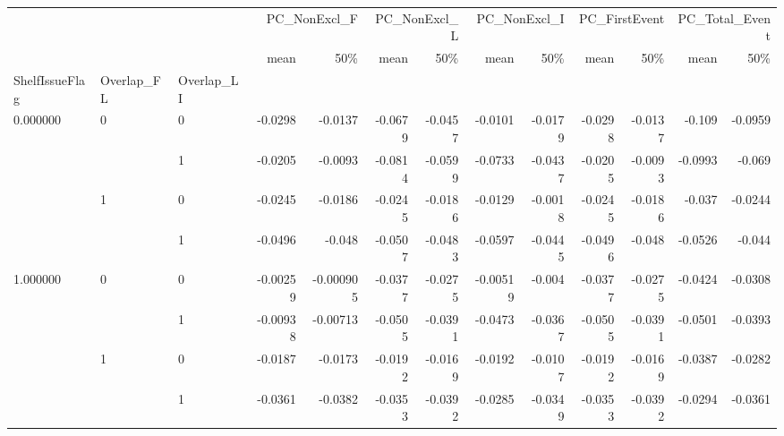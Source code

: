 \begin{tabular}{lllrrrrrrrrrr}
\toprule
 &  &  & \multicolumn{2}{r}{PC\_NonExcl\_F} & \multicolumn{2}{r}{PC\_NonExcl\_L} & \multicolumn{2}{r}{PC\_NonExcl\_I} & \multicolumn{2}{r}{PC\_FirstEvent} & \multicolumn{2}{r}{PC\_Total\_Event} \\
 &  &  & mean & 50\% & mean & 50\% & mean & 50\% & mean & 50\% & mean & 50\% \\
ShelfIssueFlag & Overlap_FL & Overlap_LI &  &  &  &  &  &  &  &  &  &  \\
\midrule
\multirow[t]{4}{*}{0.000000} & \multirow[t]{2}{*}{0} & 0 & -0.0298 & -0.0137 & -0.0679 & -0.0457 & -0.0101 & -0.0179 & -0.0298 & -0.0137 & -0.109 & -0.0959 \\
 &  & 1 & -0.0205 & -0.0093 & -0.0814 & -0.0599 & -0.0733 & -0.0437 & -0.0205 & -0.0093 & -0.0993 & -0.069 \\
\cline{2-13}
 & \multirow[t]{2}{*}{1} & 0 & -0.0245 & -0.0186 & -0.0245 & -0.0186 & -0.0129 & -0.0018 & -0.0245 & -0.0186 & -0.037 & -0.0244 \\
 &  & 1 & -0.0496 & -0.048 & -0.0507 & -0.0483 & -0.0597 & -0.0445 & -0.0496 & -0.048 & -0.0526 & -0.044 \\
\cline{1-13} \cline{2-13}
\multirow[t]{4}{*}{1.000000} & \multirow[t]{2}{*}{0} & 0 & -0.00259 & -0.000905 & -0.0377 & -0.0275 & -0.00519 & -0.004 & -0.0377 & -0.0275 & -0.0424 & -0.0308 \\
 &  & 1 & -0.00938 & -0.00713 & -0.0505 & -0.0391 & -0.0473 & -0.0367 & -0.0505 & -0.0391 & -0.0501 & -0.0393 \\
\cline{2-13}
 & \multirow[t]{2}{*}{1} & 0 & -0.0187 & -0.0173 & -0.0192 & -0.0169 & -0.0192 & -0.0107 & -0.0192 & -0.0169 & -0.0387 & -0.0282 \\
 &  & 1 & -0.0361 & -0.0382 & -0.0353 & -0.0392 & -0.0285 & -0.0349 & -0.0353 & -0.0392 & -0.0294 & -0.0361 \\
\cline{1-13} \cline{2-13}
\bottomrule
\end{tabular}
